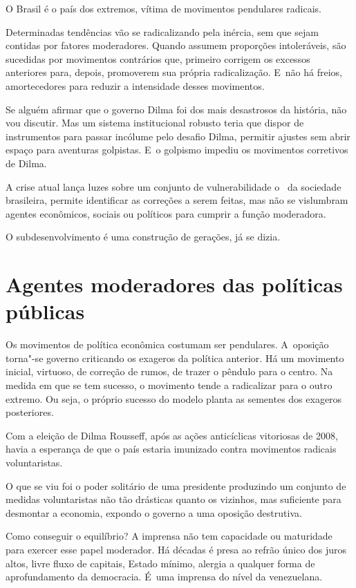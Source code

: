  

O Brasil é o país dos extremos, vítima de movimentos pendulares
radicais.

Determinadas tendências vão se radicalizando pela inércia, sem que sejam
contidas por fatores moderadores. Quando assumem proporções
intoleráveis, são sucedidas por movimentos contrários que, primeiro
corrigem os excessos anteriores para, depois, promoverem sua própria
radicalização. E~não há freios, amortecedores para reduzir a intensidade
desses movimentos.

Se alguém afirmar que o governo Dilma foi dos mais desastrosos da
história, não vou discutir. Mas um sistema institucional robusto teria
que dispor de instrumentos para passar incólume pelo desafio Dilma,
permitir ajustes sem abrir espaço para aventuras golpistas. E~o golpismo
impediu os movimentos corretivos de Dilma.

A crise atual lança luzes sobre um conjunto de vulnerabilidade o ~da
sociedade brasileira, permite identificar as correções a serem feitas,
mas não se vislumbram agentes econômicos, sociais ou políticos para
cumprir a função moderadora.

O subdesenvolvimento é uma construção de gerações, já se dizia.

\section{Agentes moderadores das políticas públicas}

Os movimentos de política econômica costumam ser pendulares. A~oposição
torna"-se governo criticando os exageros da política anterior. Há um
movimento inicial, virtuoso, de correção de rumos, de trazer o pêndulo
para o centro. Na medida em que se tem sucesso, o movimento tende a
radicalizar para o outro extremo. Ou seja, o próprio sucesso do modelo
planta as sementes dos exageros posteriores.

Com a eleição de Dilma Rousseff, após as ações anticíclicas vitoriosas
de 2008, havia a esperança de que o país estaria imunizado contra
movimentos radicais voluntaristas.

O que se viu foi o poder solitário de uma presidente produzindo um
conjunto de medidas voluntaristas não tão drásticas quanto os vizinhos,
mas suficiente para desmontar a economia, expondo o governo a uma
oposição destrutiva.

Como conseguir o equilíbrio? A imprensa não tem capacidade ou maturidade
para exercer esse papel moderador. Há décadas é presa ao refrão único
dos juros altos, livre fluxo de capitais, Estado mínimo, alergia a
qualquer forma de aprofundamento da democracia. É~uma imprensa do nível
da venezuelana.

